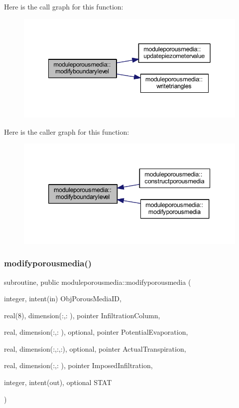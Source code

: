 Here is the call graph for this function\+:\nopagebreak
\begin{figure}[H]
\begin{center}
\leavevmode
\includegraphics[width=342pt]{namespacemoduleporousmedia_a92e9c5aa327b8fb0f60c057a8885230d_cgraph}
\end{center}
\end{figure}
Here is the caller graph for this function\+:\nopagebreak
\begin{figure}[H]
\begin{center}
\leavevmode
\includegraphics[width=339pt]{namespacemoduleporousmedia_a92e9c5aa327b8fb0f60c057a8885230d_icgraph}
\end{center}
\end{figure}
\mbox{\label{namespacemoduleporousmedia_a382cfd35fca1c040d9c4d2fb68011276}} 
\subsubsection{\texorpdfstring{modifyporousmedia()}{modifyporousmedia()}}
{\footnotesize\ttfamily subroutine, public moduleporousmedia\+::modifyporousmedia (\begin{DoxyParamCaption}\item[{integer, intent(in)}]{Obj\+Porous\+Media\+ID,  }\item[{real(8), dimension(\+:,\+:  ), pointer}]{Infiltration\+Column,  }\item[{real, dimension(\+:,\+:  ), optional, pointer}]{Potential\+Evaporation,  }\item[{real, dimension(\+:,\+:,\+:), optional, pointer}]{Actual\+Transpiration,  }\item[{real, dimension(\+:,\+:  ), pointer}]{Imposed\+Infiltration,  }\item[{integer, intent(out), optional}]{S\+T\+AT }\end{DoxyParamCaption})}


